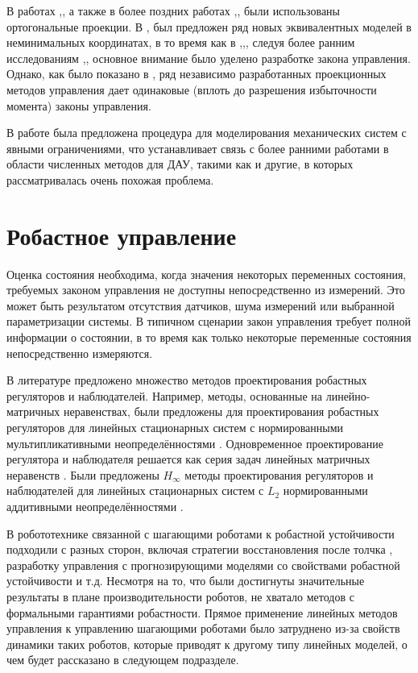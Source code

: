 В работах \cite{Aghili2003},\cite{Aghili2005}, а также в более поздних работах \cite{Mistry2010},\cite{Righetti2011},\cite{Righetti2013} были использованы ортогональные проекции. В \cite{Aghili2003},\cite{Aghili2005} был предложен ряд новых эквивалентных моделей в неминимальных координатах, в то время как в \cite{Mistry2010},\cite{Righetti2011},\cite{Righetti2013}, следуя более ранним исследованиям \cite{Khatib2007},\cite{Sentis2005}, основное внимание было уделено разработке закона управления. Однако, как было показано в \cite{Righetti2011}, ряд независимо разработанных проекционных методов управления дает одинаковые (вплоть до разрешения избыточности момента) законы управления.

В работе \cite{Aghili2003} была предложена процедура для моделирования механических систем с явными ограничениями, что устанавливает связь с более ранними работами в области численных методов для ДАУ, такими как \cite{Liang1987} и другие, в которых рассматривалась очень похожая проблема.

\section{Робастное управление}\label{sec:ch1/sec4}
Оценка состояния необходима, когда значения некоторых переменных состояния, требуемых законом управления не доступны непосредственно из измерений. Это может быть результатом отсутствия датчиков, шума измерений или выбранной параметризации системы. В типичном сценарии закон управления требует полной информации о состоянии, в то время как только некоторые переменные состояния непосредственно измеряются.

В литературе предложено множество методов проектирования робастных регуляторов и наблюдателей. Например, методы, основанные на линейно-матричных неравенствах, были предложены для проектирования робастных регуляторов для линейных стационарных систем с нормированными мультипликативными неопределённостями \cite{POLYAK2021,ROTONDO2014}.
Одновременное проектирование регулятора и наблюдателя решается как серия задач линейных матричных неравенств \cite{ZEMOUCHE2015,GRITLI2021}. Были предложены $H_\infty$ методы проектирования регуляторов и наблюдателей для линейных стационарных систем с $L_2$ нормированными аддитивными неопределённостями \cite{Bennani2019, KHELOUFI2016}.

В робототехнике связанной с шагающими роботами к робастной устойчивости подходили с разных сторон, включая стратегии восстановления после толчка \cite{Pratt2006}, разработку управления с прогнозирующими моделями со свойствами робастной устойчивости \cite{KIM2019} и т.д. Несмотря на то, что были достигнуты значительные результаты в плане производительности роботов, не хватало методов с формальными гарантиями робастности. Прямое применение линейных методов управления к управлению шагающими роботами было затруднено из-за свойств динамики таких роботов, которые приводят к другому типу линейных моделей, о чем будет рассказано в следующем подразделе.

